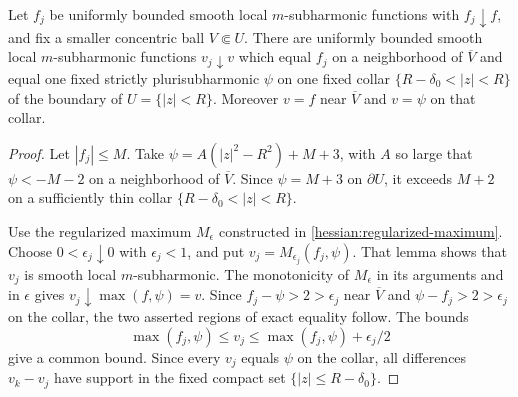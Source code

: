\begin{lemma}\label{hessian:boundary-localization}
Let $f_j$ be uniformly bounded smooth local $m$-subharmonic functions
with $f_j\downarrow f$, and fix a smaller concentric ball $V\Subset U$.
There are uniformly bounded smooth local $m$-subharmonic functions
$v_j\downarrow v$ which equal $f_j$ on a neighborhood of $\overline V$
and equal one fixed strictly plurisubharmonic $\psi$ on one fixed
collar $\{R-\delta_0<|z|<R\}$ of the boundary of $U=\{|z|<R\}$.
Moreover $v=f$ near $\overline V$ and $v=\psi$ on that collar.
\end{lemma}
\begin{proof}
Let $|f_j|\leq M$. Take $\psi=A(|z|^2-R^2)+M+3$, with $A$ so large
that $\psi<-M-2$ on a neighborhood of $\overline V$. Since $\psi=M+3$
on $\partial U$, it exceeds $M+2$ on a sufficiently thin collar
$\{R-\delta_0<|z|<R\}$.

Use the regularized maximum $M_\epsilon$ constructed in
\cref{hessian:regularized-maximum}. Choose $0<\epsilon_j\downarrow0$
with $\epsilon_j<1$, and put $v_j=M_{\epsilon_j}(f_j,\psi)$.
That lemma shows that $v_j$ is smooth local $m$-subharmonic. The
monotonicity of $M_\epsilon$ in its arguments and in $\epsilon$ gives
$v_j\downarrow\max(f,\psi)=v$. Since $f_j-\psi>2>\epsilon_j$ near
$\overline V$ and $\psi-f_j>2>\epsilon_j$ on the collar, the two
asserted regions of exact equality follow. The bounds
\[
 \max(f_j,\psi)\leq v_j\leq\max(f_j,\psi)+\epsilon_j/2
\]
give a common bound. Since every $v_j$ equals $\psi$ on the collar,
all differences $v_k-v_j$ have support in the fixed compact set
$\{|z|\leq R-\delta_0\}$.
\end{proof}

